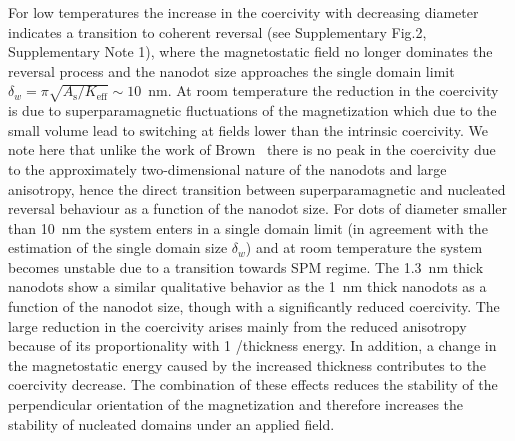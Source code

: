 \documentclass[aps,prb,signlecolumn,preprint,superscriptaddress,10]{revtex4-1}
\newcommand{\Keff}{\ensuremath{K_{\mathrm{eff}}}\xspace}
\newcommand{\As}{\ensuremath{A_{\mathrm{s}}}\xspace}
\begin{document}
 For low temperatures the increase in the coercivity with decreasing diameter indicates a transition to coherent reversal (see Supplementary Fig.2, Supplementary Note 1), where the magnetostatic field no longer dominates the reversal process and the nanodot size approaches the single domain limit $\delta_w = \pi \sqrt{\As/\Keff} \sim 10$~nm. At room temperature the reduction in the coercivity is due to superparamagnetic fluctuations of the magnetization which due to the small volume lead to switching at fields lower than the intrinsic coercivity.
 We note here that unlike the work of Brown~\cite{Brown1963} there is no peak in the coercivity due to the approximately two-dimensional nature of the nanodots and large anisotropy, hence the direct transition between superparamagnetic and nucleated reversal behaviour as a function of the nanodot size. For dots of diameter smaller than 10~nm the system enters in a single domain limit (in agreement with the estimation of the single domain size $\delta_w$) and at room temperature the system becomes unstable due to a transition towards SPM regime. 
 The 1.3~nm thick nanodots show a similar qualitative behavior as the 1~nm thick nanodots as a function of the nanodot size, though with a significantly reduced coercivity. The large reduction in the coercivity arises mainly from the reduced anisotropy because of its proportionality with 1 /thickness energy. In addition, a change in the magnetostatic energy caused by the increased thickness contributes to the coercivity decrease.
The combination of these effects reduces the stability of the perpendicular orientation of the magnetization and therefore increases the stability of nucleated domains under an applied field. 
\end{document}
